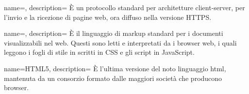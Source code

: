 
{
  name=,
  description={ È un protocollo standard per architetture client-server, per l'invio e la ricezione di pagine web, ora diffuso nella
  versione HTTPS. }
}

{
  name=,
  description={ È il linguaggio di markup standard per i documenti visualizzabili nel web. Questi sono letti e
  interpretati da i browser web, i quali leggono i fogli di stile in scritti in CSS e gli script in JavaScript. }
}

{
  name=HTML5,
  description={ È l'ultima versione del noto linguaggio \acrshort{html}, mantenuta da un consorzio formato dalle
  maggiori società che producono browser.}
}
